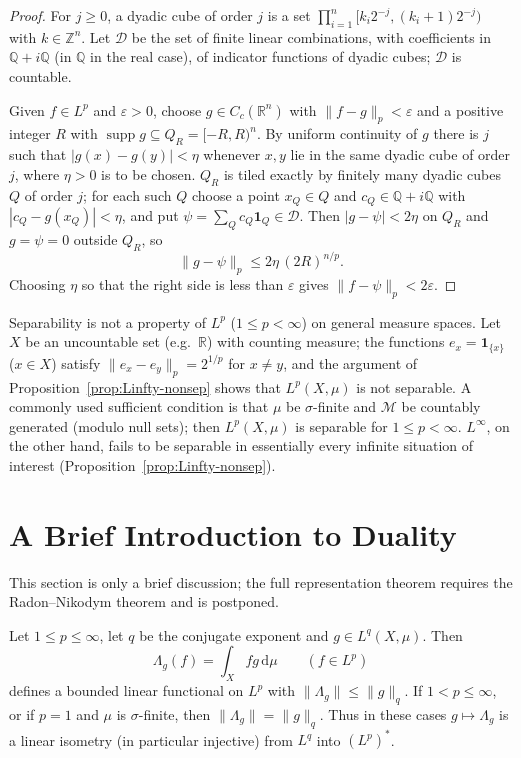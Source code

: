 \documentclass[11pt]{article}
\newcommand{\R}{\mathbb{R}}
\newcommand{\Q}{\mathbb{Q}}
\newcommand{\M}{\mathcal{M}}
\newcommand{\norm}[1]{\lVert #1\rVert}
\newcommand{\dmu}{\,\mathrm{d}\mu}
\newcommand{\ind}{\mathbf{1}}
\DeclareMathOperator{\supp}{supp}
\begin{document}
\begin{proof}
For $j\ge0$, a dyadic cube of order $j$ is a set $\prod_{i=1}^{n}[k_{i}2^{-j},(k_{i}+1)2^{-j})$ with $k\in\mathbb{Z}^{n}$. Let $\mathcal{D}$ be the set of finite linear combinations, with coefficients in $\Q+i\Q$ (in $\Q$ in the real case), of indicator functions of dyadic cubes; $\mathcal{D}$ is countable.

Given $f\in L^{p}$ and $\varepsilon>0$, choose $g\in C_{c}(\R^{n})$ with $\norm{f-g}_{p}<\varepsilon$ and a positive integer $R$ with $\supp g\subseteq Q_{R}=[-R,R)^{n}$. By uniform continuity of $g$ there is $j$ such that $|g(x)-g(y)|<\eta$ whenever $x,y$ lie in the same dyadic cube of order $j$, where $\eta>0$ is to be chosen. $Q_{R}$ is tiled exactly by finitely many dyadic cubes $Q$ of order $j$; for each such $Q$ choose a point $x_{Q}\in Q$ and $c_{Q}\in\Q+i\Q$ with $|c_{Q}-g(x_{Q})|<\eta$, and put $\psi=\sum_{Q}c_{Q}\ind_{Q}\in\mathcal{D}$. Then $|g-\psi|<2\eta$ on $Q_{R}$ and $g=\psi=0$ outside $Q_{R}$, so
\[
\norm{g-\psi}_{p}\le2\eta\,(2R)^{n/p}.
\]
Choosing $\eta$ so that the right side is less than $\varepsilon$ gives $\norm{f-\psi}_{p}<2\varepsilon$.
\end{proof}

\begin{remark}
Separability is not a property of $L^{p}$ ($1\le p<\infty$) on general measure spaces. Let $X$ be an uncountable set (e.g.\ $\R$) with counting measure; the functions $e_{x}=\ind_{\{x\}}$ ($x\in X$) satisfy $\norm{e_{x}-e_{y}}_{p}=2^{1/p}$ for $x\ne y$, and the argument of Proposition~\ref{prop:Linfty-nonsep} shows that $L^{p}(X,\mu)$ is not separable. A commonly used sufficient condition is that $\mu$ be $\sigma$-finite and $\M$ be countably generated (modulo null sets); then $L^{p}(X,\mu)$ is separable for $1\le p<\infty$. $L^{\infty}$, on the other hand, fails to be separable in essentially every infinite situation of interest (Proposition~\ref{prop:Linfty-nonsep}).
\end{remark}

\section{A Brief Introduction to Duality}

This section is only a brief discussion; the full representation theorem requires the Radon--Nikodym theorem and is postponed.

\begin{proposition}\label{prop:dual-isometry}
Let $1\le p\le\infty$, let $q$ be the conjugate exponent and $g\in L^{q}(X,\mu)$. Then
\[
\Lambda_{g}(f)=\int_{X}fg\dmu\qquad(f\in L^{p})
\]
defines a bounded linear functional on $L^{p}$ with $\norm{\Lambda_{g}}\le\norm{g}_{q}$. If $1<p\le\infty$, or if $p=1$ and $\mu$ is $\sigma$-finite, then $\norm{\Lambda_{g}}=\norm{g}_{q}$. Thus in these cases $g\mapsto\Lambda_{g}$ is a linear isometry (in particular injective) from $L^{q}$ into $(L^{p})^{*}$.
\end{proposition}
\end{document}
